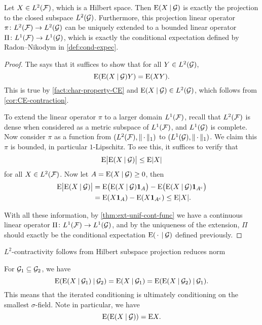 \begin{thm}
    Let $X \in L^2(\mathcal{F})$, which is a Hilbert space. Then $\mathop{}\!\mathrm{E}(X \mathbin{|} \mathcal{G})$ is exactly the projection to the closed subspace $L^2(\mathcal{G})$. Furthermore, this projection linear operator $\pi\colon L^2(\mathcal{F}) \to L^2(\mathcal{G})$ can be uniquely extended to a bounded linear operator $\Pi\colon L^1(\mathcal{F})\to L^1(\mathcal{G})$, which is exactly the conditional expectation defined by Radon--Nikodym in \cref{def:cond-expec}.
\end{thm}
\begin{proof}
    The  says that it suffices to show that for all $Y \in L^2(\mathcal{G})$, \[
        \mathop{}\!\mathrm{E}(\mathop{}\!\mathrm{E}(X \mathbin{|} \mathcal{G}) Y) = \mathop{}\!\mathrm{E}(XY).
    \]
    This is true by \cref{fact:char-property-CE} and $\mathop{}\!\mathrm{E}(X \mathbin{|} \mathcal{G}) \in L^2(\mathcal{G})$, which follows from \cref{cor:CE-contraction}.
    
    To extend the linear operator $\pi$ to a larger domain $L^1(\mathcal{F})$, recall that $L^2(\mathcal{F})$ is dense when considered as a metric subspace of $L^1(\mathcal{F})$, and $L^1(\mathcal{G})$ is complete. Now consider $\pi$ as a function from $(L^2(\mathcal{F}),\lVert \,\cdot\, \rVert_1)$ to $(L^1(\mathcal{G}),\lVert \,\cdot\, \rVert_1)$. We claim this $\pi$ is bounded, in particular $1$-Lipschitz. To see this, it suffices to verify that \[
        \mathop{}\!\mathrm{E} \bigl\vert\mathop{}\!\mathrm{E}(X\mathbin{|} \mathcal{G})\bigr\vert \leq \mathop{}\!\mathrm{E} \lvert X \rvert
    \] for all $X \in L^2(\mathcal{F})$. Now let $A = {\mathop{}\!\mathrm{E}(X \mathbin{|} \mathcal{G}) \geq 0}$, then \begin{align*}
        \E \bigl\vert\E(X\giv \G)\bigr\vert & = \E\bigl(\E (X \giv \G)\ind_A\bigr) - \E\bigl(\E(X \giv \G)\ind_{A^\cpl}\bigr) \\
        & = \E(X \ind_A) - \E(X\ind_{A^\cpl}) \leq \E\abs{X}.
    \end{align*}

    With all these information, by \cref{thm:ext-unif-cont-func} we have a continuous linear operator $\Pi\colon L^1(\mathcal{F}) \to L^1(\mathcal{G})$, and by the uniqueness of the extension, $\Pi$ should exactly be the conditional expectation $\mathop{}\!\mathrm{E}(\,\cdot\, \mathbin{|} \mathcal{G})$ defined previously.
\end{proof}

$L^2$-contractivity follows from Hilbert subspace projection reduces norm

\begin{namedthm} \label{thm:tower}
    For $\mathcal{G}_1 \subseteq \mathcal{G}_2$, we have \[
        \mathop{}\!\mathrm{E}(\mathop{}\!\mathrm{E}(X\mathbin{|} \mathcal{G}_1) \mathbin{|} \mathcal{G}_2) = \mathop{}\!\mathrm{E}(X\mathbin{|} \mathcal{G}_1) = \mathop{}\!\mathrm{E}(\mathop{}\!\mathrm{E}(X\mathbin{|} \mathcal{G}_2) \mathbin{|} \mathcal{G}_1).
    \] This means that the iterated conditioning is ultimately conditioning on the smallest $\sigma$-field. Note in particular, we have \[
        \mathop{}\!\mathrm{E}(\mathop{}\!\mathrm{E}(X \mathbin{|} \mathcal{G})) = \mathop{}\!\mathrm{E} X.
    \]
\end{namedthm}

